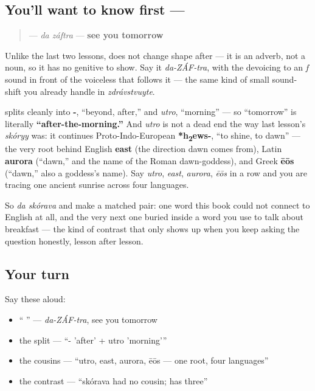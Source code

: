 \subsection*{You'll want to know first —  }
\begin{quote}
\textbf{ } — \emph{da záftra} — \textbf{see you tomorrow}
\end{quote}

Unlike the last two lessons, \textbf{} does not change shape after \textbf{} — it is an adverb, not a noun, so it has no genitive to show. Say it \emph{da-ZÁF-tra}, with the \textbf{} devoicing to an \emph{f} sound in front of the voiceless \textbf{} that follows it — the same kind of small sound-shift you already handle in \emph{zdrávstvuyte}.

\begin{cousinweb}
\textbf{} splits cleanly into \textbf{-}, \textquotedblleft{}beyond, after,\textquotedblright{} and \emph{utro}, \textquotedblleft{}morning\textquotedblright{} — so \textquotedblleft{}tomorrow\textquotedblright{} is literally \textbf{\textquotedblleft{}after-the-morning.\textquotedblright{}} And \emph{utro} is not a dead end the way last lesson's \emph{skóryy} was: it continues Proto-Indo-European \textbf{*h\textsubscript{2}ews-}, \textquotedblleft{}to shine, to dawn\textquotedblright{} — the very root behind English \textbf{east} (the direction dawn comes from), Latin \textbf{aurora} (\textquotedblleft{}dawn,\textquotedblright{} and the name of the Roman dawn-goddess), and Greek \textbf{ēōs} (\textquotedblleft{}dawn,\textquotedblright{} also a goddess's name). Say \emph{utro}, \emph{east}, \emph{aurora}, \emph{ēōs} in a row and you are tracing one ancient sunrise across four languages.

So \emph{da skórava} and \emph{ } make a matched pair: one word this book could not connect to English at all, and the very next one buried inside a word you use to talk about breakfast — the kind of contrast that only shows up when you keep asking the question honestly, lesson after lesson.
\end{cousinweb}

\subsection*{Your turn}
Say these aloud:

\begin{itemize}
\raggedright
  \item \textquotedblleft{} \textquotedblright{} — \emph{da-ZÁF-tra}, see you tomorrow
  \item the split — \textquotedblleft{}- 'after' + utro 'morning'\textquotedblright{}
  \item the cousins — \textquotedblleft{}utro, east, aurora, ēōs — one root, four languages\textquotedblright{}
  \item the contrast — \textquotedblleft{}skórava had no cousin;  has three\textquotedblright{}
\end{itemize}

